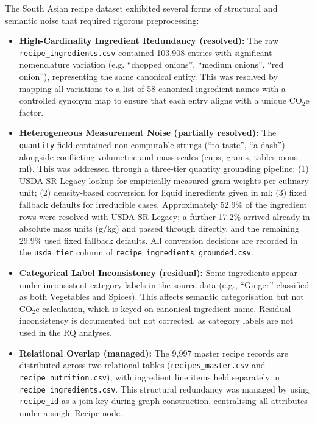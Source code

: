 \documentclass{article}
\begin{document}
The South Asian recipe dataset exhibited several forms of structural and semantic noise that required rigorous preprocessing:

\begin{itemize}
    \item \textbf{High-Cardinality Ingredient Redundancy (resolved):} The raw \texttt{recipe\_ingredients.csv} contained 103,908 entries with significant nomenclature variation (e.g. ``chopped onions'', ``medium onions'', ``red onion''), representing the same canonical entity. This was resolved by mapping all variations to a list of 58 canonical ingredient names with a controlled synonym map to ensure that each entry aligns with a unique CO$_2$e factor.
    \item \textbf{Heterogeneous Measurement Noise (partially resolved):} The \texttt{quantity} field contained non-computable strings (``to taste'', ``a dash'') alongside conflicting volumetric and mass scales (cups, grams, tablespoons, ml). This was addressed through a three-tier quantity grounding pipeline: (1) USDA SR Legacy lookup for empirically measured gram weights per culinary unit; (2) density-based conversion for liquid ingredients given in ml; (3) fixed fallback defaults for irreducible cases. Approximately 52.9\% of the ingredient rows were resolved with USDA SR Legacy; a further 17.2\% arrived already in absolute mass units (g/kg) and passed through directly, and the remaining 29.9\% used fixed fallback defaults. All conversion decisions are recorded in the \texttt{usda\_tier} column of \texttt{recipe\_ingredients\_grounded.csv}.
    \item \textbf{Categorical Label Inconsistency (residual):} Some ingredients appear under inconsistent category labels in the source data (e.g., ``Ginger'' classified as both Vegetables and Spices). This affects semantic categorisation but not CO$_2$e calculation, which is keyed on canonical ingredient name. Residual inconsistency is documented but not corrected, as category labels are not used in the RQ analyses.
    \item \textbf{Relational Overlap (managed):} The 9,997 master recipe records are distributed across two relational tables (\texttt{recipes\_master.csv} and \texttt{recipe\_nutrition.csv}), with ingredient line items held separately in \texttt{recipe\_ingredients.csv}. This structural redundancy was managed by using \texttt{recipe\_id} as a join key during graph construction, centralising all attributes under a single Recipe node.
\end{itemize}
\end{document}
